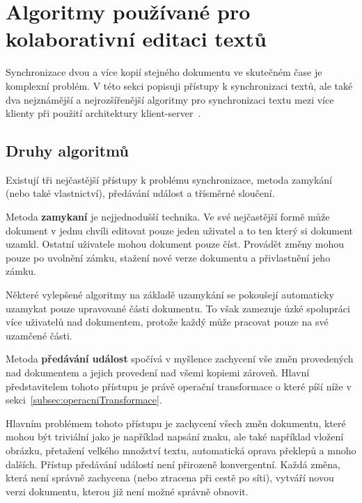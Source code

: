
\section{Algoritmy používané pro kolaborativní editaci textů}\label{sec:algoritmyProKolaborativníEditaci}

Synchronizace dvou a více kopií stejného dokumentu ve skutečném čase je komplexní problém.
V této sekci popisuji přístupy k synchronizaci textů, ale také dva nejznámější a nejrozšířenější algoritmy pro synchronizaci textu mezi více klienty při použití architektury klient-server~\cite{algoritmy:first}.

\subsection{Druhy algoritmů}\label{subsec:druhyAlgoritmů}

Existují tři nejčastější přístupy k problému synchronizace, metoda zamykání (nebo také vlastnictví), předávání událost a třísměrné sloučení.

Metoda \textbf{zamykaní} je nejjednodušší technika.
Ve své nejčastější formě může dokument v jednu chvíli editovat pouze jeden uživatel a to ten který si dokument uzamkl.
Ostatní uživatele mohou dokument pouze číst.
Provádět změny mohou pouze po uvolnění zámku, stažení nové verze dokumentu a přivlastnění jeho zámku.

Některé vylepšené algoritmy na základě uzamykání se pokoušejí automaticky uzamykat pouze upravované části dokumentu.
To však zamezuje úzké spolupráci více uživatelů nad dokumentem, protože každý může pracovat pouze na své uzamčené části.

Metoda \textbf{předávání událost} spočívá v myšlence zachycení vše změn provedených nad dokumentem a jejich provedení nad všemi kopiemi zároveň.
Hlavní představitelem tohoto přístupu je právě operační transformace o které píší níže v sekci~\ref{subsec:operacniTransformace}.

Hlavním problémem tohoto přístupu je zachycení všech změn dokumentu, které mohou být triviální jako je například napsání znaku, ale také například vložení obrázku, přetažení velkého množství textu, automatická oprava překlepů a mnoho dalších.
Přístup předávání událostí není přirozeně konvergentní.
Každá změna, která není správně zachycena (nebo ztracena při cestě po síti), vytváří novou verzi dokumentu, kterou již není možné správně obnovit.

